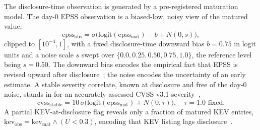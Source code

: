 \documentclass[journal]{IEEEtran}
\begin{document}
The disclosure-time observation is generated by a pre-registered maturation model. The day-0 EPSS
observation is a biased-low, noisy view of the matured value,
\begin{equation}
\mathrm{epss_{obs}} = \sigma\!\big(\mathrm{logit}(\mathrm{epss_{mat}}) - b + N(0, s)\big),
\end{equation}
clipped to $[10^{-4}, 1]$, with a fixed disclosure-time downward bias $b = 0.75$ in logit units and
a noise scale $s$ swept over $\{0.0, 0.25, 0.50, 0.75, 1.0\}$, the reference level being $s = 0.50$.
The downward bias encodes the empirical fact that EPSS is revised upward after
disclosure~\cite{jacobs2023enhancing}; the noise encodes the uncertainty of an early estimate. A
stable severity correlate, known at disclosure and free of the day-0 noise, stands in for an
accurately assessed CVSS v3.1 severity~\cite{cvss31},
\begin{equation}
\mathrm{cvss_{stable}} = 10\,\sigma\!\big(\mathrm{logit}(\mathrm{epss_{mat}}) + N(0, \tau)\big),
\quad \tau = 1.0 \text{ fixed}.
\end{equation}
A partial KEV-at-disclosure flag reveals only a fraction of matured KEV entries,
$\mathrm{kev_{obs}} = \mathrm{kev_{mat}} \wedge (U < 0.3)$, encoding that KEV listing lags
disclosure~\cite{cisakev}.
\end{document}
